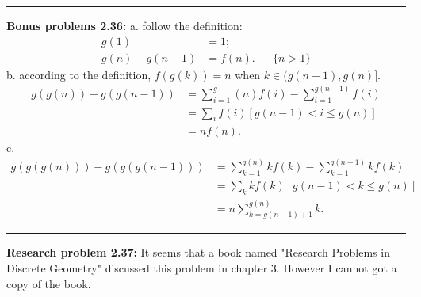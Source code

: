 \documentclass{article}
\begin{document}
\noindent\rule{\textwidth}{0.4pt}
\textbf{Bonus problems 2.36:}
a. follow the definition:
\begin{align}
g(1) &= 1; \\
g(n) - g(n-1) &= f(n). && \{n > 1\}
\end{align}
b. according to the definition, $f(g(k)) = n$ when $k \in (g(n-1), g(n)]$.
\begin{align}
g(g(n)) - g(g(n-1)) &= \sum_{i = 1}^g(n) f(i) - \sum_{i = 1}^{g(n-1)} f(i) \\
		    &= \sum_{i} f(i)[g(n-1) < i \le g(n)] \\
		    &= n f(n).
\end{align}
c. 
\begin{align}
g(g(g(n))) - g(g(g(n-1))) &= \sum_{k=1}^{g(n)} kf(k) - \sum_{k=1}^{g(n-1)} kf(k) \\
			  &= \sum_k kf(k)[g(n-1) < k \le g(n)] \\
			  &= n \sum_{k = g(n-1) + 1}^{g(n)}k.
\end{align}

\noindent\rule{\textwidth}{0.4pt}
\textbf{Research problem 2.37:}
It seems that a book named "Research Problems in Discrete Geometry" discussed this problem in chapter 3.
However I cannot got a copy of the book.
\end{document}

